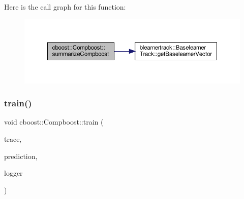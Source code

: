 Here is the call graph for this function\+:\nopagebreak
\begin{figure}[H]
\begin{center}
\leavevmode
\includegraphics[width=350pt]{classcboost_1_1_compboost_a7be8cb767054ece895d535c1f468233e_cgraph}
\end{center}
\end{figure}
\mbox{\label{classcboost_1_1_compboost_aa898572eb2c83e0b95c12788a859333b}} 
\subsubsection{\texorpdfstring{train()}{train()}}
{\footnotesize\ttfamily void cboost\+::\+Compboost\+::train (\begin{DoxyParamCaption}\item[{const bool \&}]{trace,  }\item[{const arma\+::vec \&}]{prediction,  }\item[{\hyperlink{classloggerlist_1_1_logger_list}{loggerlist\+::\+Logger\+List} $\ast$}]{logger }\end{DoxyParamCaption})}

